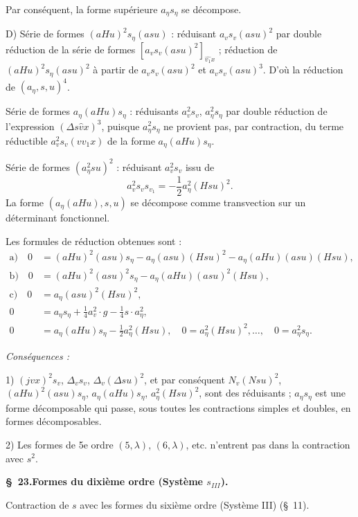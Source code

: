 \documentclass[11pt]{article}
\newcommand{\A}{\Delta}
\begin{document}
Par conséquent, la forme supérieure $a_\eta s_\eta$ se décompose.

D) Série de formes $(aHu)^2s_\eta(asu)$ : réduisant $a_v s_v(asu)^2$ par double réduction de la série de formes $[a_v s_v(asu)^2]_{\widehat{v_1}x}$ ; réduction de $(aHu)^2s_\eta(asu)^2$ à partir de $a_v s_v(asu)^2$ et $a_v s_v(asu)^3$. D'où la réduction de $(a_\eta,s,u)^4$.

Série de formes $a_\eta(aHu)s_\eta$ : réduisants $a_v^2s_v$, $a_\eta^2s_\eta$ par double réduction de l'expression $(\A s\widehat vx)^3$, puisque $a_\eta^2s_\eta$ ne provient pas, par contraction, du terme réductible $a_v^2s_v(vv_1x)$ de la forme $a_\eta(aHu)s_\eta$.

Série de formes $(a_\eta^2su)^2$ : réduisant $a_v^2s_v$ issu de
\[
a_v^2s_v s_{v_1}=-\frac12a_\eta^2(Hsu)^2.
\]
La forme $(a_\eta(aHu),s,u)$ se décompose comme transvection sur un déterminant fonctionnel.

Les formules de réduction obtenues sont :
\[
\tag{30}
\begin{aligned}
\text{a)}\quad 0&=(aHu)^2(asu)s_\eta-a_\eta(asu)(Hsu)^2-a_\eta(aHu)(asu)(Hsu),\\
\text{b)}\quad 0&=(aHu)^2(asu)^2s_\eta-a_\eta(aHu)(asu)^2(Hsu),\\
\text{c)}\quad 0&=a_\eta(asu)^2(Hsu)^2,\\
0&=a_\eta s_\eta+\frac14a_v^2\cdot g-\frac14s\cdot a_\eta^2,\\
0&=a_\eta(aHu)s_\eta-\frac12a_\eta^2(Hsu),
\quad 0=a_\eta^2(Hsu)^2,\ldots,
\quad 0=a_\eta^2s_\eta.
\end{aligned}
\]

\noindent\emph{Conséquences :}

1) $(jv x)^2s_v$, $\A_v s_v$, $\A_v(\A su)^2$, et par conséquent $N_v(Nsu)^2$, $(aHu)^2(asu)s_\eta$, $a_\eta(aHu)s_\eta$, $a_\eta^2(Hsu)^2$, sont des réduisants ; $a_\eta s_\eta$ est une forme décomposable qui passe, sous toutes les contractions simples et doubles, en formes décomposables.

2) Les formes de 5e ordre $(5,\lambda)$, $(6,\lambda)$, etc. n'entrent pas dans la contraction avec $s^2$.

\begin{center}\textbf{\S\ 23.\quad Formes du dixième ordre (Système $s_{III}$).}\end{center}
Contraction de $s$ avec les formes du sixième ordre (Système III) (\S\ 11).
\end{document}
